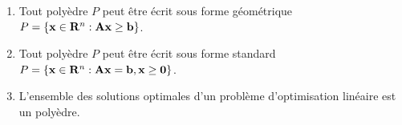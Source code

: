 \begin{enumerate}
\begin{enumerate}


      \item Tout polyèdre $P$ peut être écrit sous forme géométrique $P=\{ {\bf x} \in {\bf R}^n: \bf A \bf x\geq \bf b\}$.

      \item Tout polyèdre $P$ peut être écrit sous forme standard
        $P=\{ {\bf x} \in {\bf R}^n: \bf A \bf x= \bf b, \bf x \geq 0\}$.










      \item L'ensemble des solutions optimales d'un problème d'optimisation linéaire est un polyèdre.



\end{enumerate}
\end{enumerate}
